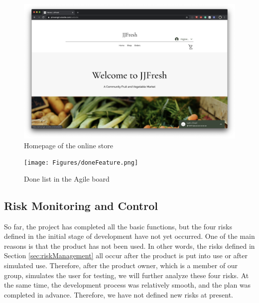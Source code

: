 \documentclass{report}
\begin{document}
\begin{figure}[htp]
\centering
\includegraphics[width=\textwidth]{Figures/homepage.png}
\caption{Homepage of the online store}
\label{fig:homepage}
\end{figure}

\begin{figure}[htp]
\centering
\texttt{[image: Figures/doneFeature.png]}
\caption{Done list in the Agile board}
\label{fig:doneFeature}
\end{figure}

\clearpage
\subsection{Risk Monitoring and Control}
\label{sub:riskMonitoringandControl}
So far, the project has completed all the basic functions, but the four risks defined in the initial stage of development have not yet occurred. One of the main reasons is that the product has not been used. In other words, the risks defined in Section \ref{sec:riskManagement} all occur after the product is put into use or after simulated use. Therefore, after the product owner, which is a member of our group, simulates the user for testing, we will further analyze these four risks.
At the same time, the development process was relatively smooth, and the plan was completed in advance. Therefore, we have not defined new risks at present.
\end{document}
